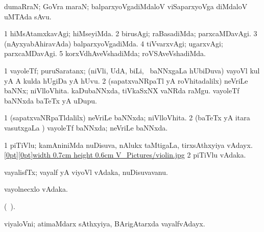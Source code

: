 {{{{{{{{\bentry
{}
\gl{\nA}
\expl{}
\bmng
 dumaRraN; GoVra maraN; balparxyoVgadiMdaloV viSaparxyoVga diMdaloV uMTAda sAvu. 
\emng
\eentry

\bentry
{} 
\gl{\kirxvi}
\expl{}
\bmng
\bnum
\num{1} hiMsAtamxkavAgi; hiMseyiMda. 
\num{2} birusAgi; raBasadiMda; parxcaMDavAgi. 
\num{3} (nAyxyabAhiravAda) balparxyoVgadiMda. 
\num{4} tiVvarxvAgi; ugarxvAgi; parxcaMDavAgi. 
\num{5} korxVdhAveVshadiMda; roVSAveVshadiMda. 
\enum
\emng
\eentry

\bentry
{} 
\gl{\nA}
\expl{}
\bmng
\bnum
\num{1} vayoleTf; puruSaratanx; (niVli, UdA, biLi, \mo\ baNNxgaLa hUbiDuva) vayoVl kul yA A kulda hUgiDa yA hUvu. 
\num{2} (sapatxvaNRpaTl yA roVhitadalilx) neVriLe baNNx; niVlloVhita. 
\banum
{} kaDubaNNxda, tiVkaSxNX vaNRda raMgu. 
 vayoleTf baNNxda baTeTx yA uDupu. 
\eanum
\numie
\enum
\emng
\eentry

\bentry
{} 
\gl{\gu}
\expl{}
\bmng
\bnum
\num{1} (sapatxvaNRpaTldalilx) neVriLe baNNxda; niVlloVhita. 
\num{2} (baTeTx yA itara vasutxgaLa \vi) vayoleTf baNNxda; neVriLe baNNxda. 
\enum
\emng
\eentry

\bentry
{} 
\gl{\nA}
\expl{}
\bmng
\bnum
\num{1} piTiVlu; kamAniniMda nuDisuva, nAlukx taMtigaLa, tirxsAthxyiya vAdayx. \quad \hyperlink{violinfigure}{\raisebox{-0.15cm}[0pt][0pt]{\pdfimage width 0.7cm height 0.6cm {V_Pictures/violin.jpg}}} 
\hypertarget{violin(2)}{} 
\num{2} piTiVlu vAdaka. 
\enum
\emng
\eentry

\bentry
{} 
\gl{\nA}
\expl{}
\bmng
\emng
\eentry

\bentry 
{} 
\gl{\nA}
\expl{}
\bmng
 vayalisfTx; vayalf  yA viyoVl vAdaka, nuDisuvavanu. 
\emng
\eentry

\bentry
{} 
\gl{\nA}
\expl{}
\bmng
 vayolnecxlo vAdaka. 
\emng
\eentry

\bentry
{} 
\gl{\nA}(\bava\ ). 
\bmng
\emng
\eentry

\bentry
{} 
\gl{\nA}
\expl{}
\bmng
 viyaloVni; atimaMdarx sAthxyiya, BArigAtarxda vayalfvAdayx. 
\emng
\eentry

}}}}}}}}
